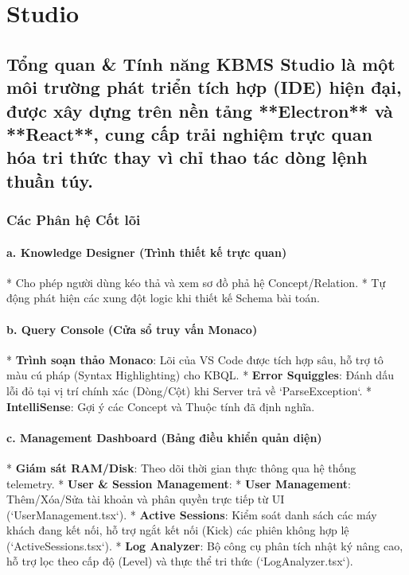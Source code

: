 \chapter{Studio}
\section{Tổng quan & Tính năng KBMS Studio là một môi trường phát triển tích hợp (IDE) hiện đại, được xây dựng trên nền tảng **Electron** và **React**, cung cấp trải nghiệm trực quan hóa tri thức thay vì chỉ thao tác dòng lệnh thuần túy.}

\subsection{Các Phân hệ Cốt lõi}

\subsubsection{a. Knowledge Designer (Trình thiết kế trực quan)}
*   Cho phép người dùng kéo thả và xem sơ đồ phả hệ Concept/Relation.
*   Tự động phát hiện các xung đột logic khi thiết kế Schema bài toán.

\subsubsection{b. Query Console (Cửa sổ truy vấn Monaco)}
*   \textbf{Trình soạn thảo Monaco}: Lõi của VS Code được tích hợp sâu, hỗ trợ tô màu cú pháp (Syntax Highlighting) cho KBQL.
*   \textbf{Error Squiggles}: Đánh dấu lỗi đỏ tại vị trí chính xác (Dòng/Cột) khi Server trả về `ParseException`.
*   \textbf{IntelliSense}: Gợi ý các Concept và Thuộc tính đã định nghĩa.

\subsubsection{c. Management Dashboard (Bảng điều khiển quản diện)}
*   \textbf{Giám sát RAM/Disk}: Theo dõi thời gian thực thông qua hệ thống telemetry.
*   \textbf{User \& Session Management}: 
    *   \textbf{User Management}: Thêm/Xóa/Sửa tài khoản và phân quyền trực tiếp từ UI (`UserManagement.tsx`).
    *   \textbf{Active Sessions}: Kiểm soát danh sách các máy khách đang kết nối, hỗ trợ ngắt kết nối (Kick) các phiên không hợp lệ (`ActiveSessions.tsx`).
*   \textbf{Log Analyzer}: Bộ công cụ phân tích nhật ký nâng cao, hỗ trợ lọc theo cấp độ (Level) và thực thể tri thức (`LogAnalyzer.tsx`).

